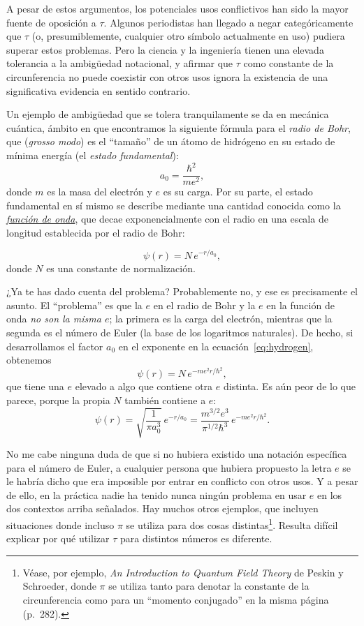 A pesar de estos argumentos, los potenciales usos conflictivos han sido la mayor fuente de oposición a $\tau$. Algunos periodistas han llegado a negar categóricamente que $\tau$ (o, presumiblemente, cualquier otro símbolo actualmente en uso) pudiera superar estos problemas. Pero la ciencia y la ingeniería tienen una elevada tolerancia a la ambigüedad notacional, y afirmar que $\tau$ como constante de la circunferencia no puede coexistir con otros usos ignora la existencia de una significativa evidencia en sentido contrario.

Un ejemplo de  ambigüedad que se tolera tranquilamente se da en mecánica cuántica, ámbito en que encontramos la siguiente fórmula para el  \emph{radio de Bohr}, que (\textit{grosso modo}) es el ``tamaño'' de un átomo de hidrógeno en su estado de mínima energía (el \emph{estado fundamental}):
\[
a_0 = \frac{\hbar^2}{m e^2},
\]
donde $m$ es la masa del electrón y $e$ es su carga. Por su parte, el estado fundamental en sí mismo se describe mediante una cantidad conocida como la \href{https://es.wikipedia.org/wiki/Función_de_onda}{\emph{función de onda}}, que decae exponencialmente con el radio en una escala de longitud establecida por el radio de Bohr:

\begin{equation}
\label{eq:hydrogen}
\psi(r) = N\,e^{-r/a_0},
\end{equation}
donde $N$ es una constante de normalización.

¿Ya te has dado cuenta del problema? Probablemente no, y ese es precisamente el asunto. El ``problema'' es que la $e$ en el radio de Bohr y la $e$ en la función de onda \emph{no son la misma $e$}; la primera es la carga del electrón, mientras que la segunda es el número de Euler (la base de los logaritmos naturales). De hecho, si desarrollamos el factor $a_0$ en el exponente en la ecuación~\eqref{eq:hydrogen}, obtenemos
\[
\psi(r) = N\,e^{-m e^2 r/\hbar^2},
\]
que tiene una $e$ elevado a algo que contiene otra $e$ distinta. Es aún peor de lo que parece, porque la propia $N$ también contiene a $e$:
\[
\psi(r) = \sqrt{\frac{1}{\pi a_0^3}}\,e^{-r/a_0} =\frac{m^{3/2} e^3}{\pi^{1/2} \hbar^3}\,e^{-m e^2 r/\hbar^2}.
\]

No me cabe ninguna duda de que si no hubiera existido una notación específica para el número de Euler, a cualquier persona que hubiera propuesto la letra $e$ se le habría dicho que era imposible por entrar en conflicto con otros usos. Y a pesar de ello, en la práctica nadie ha tenido nunca ningún problema en usar $e$ en los dos contextos arriba señalados. Hay muchos otros ejemplos, que incluyen situaciones donde incluso $\pi$ se utiliza para dos cosas distintas\footnote{Véase, por ejemplo, \emph{An Introduction to Quantum Field Theory} de Peskin y Schroeder, donde $\pi$ se utiliza tanto para denotar la constante de la circunferencia como para un ``momento conjugado'' en la misma página (p.~282).}. Resulta difícil explicar por qué utilizar $\tau$ para distintos números es diferente.


